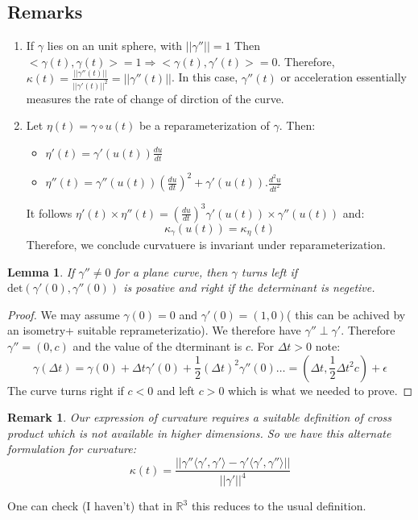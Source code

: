 \documentclass[oneside]{book}\twocolumn
\newtheorem{lemma}[theorem]{Lemma}
\newtheorem*{remark}{Remark}
\begin{document}
\subsection{Remarks}
\begin{enumerate}
    \item If $\gamma$ lies on an unit sphere, with $||\gamma''||=1$ Then $<\gamma(t),\gamma(t)>=1\Rightarrow <\gamma(t),\gamma'(t)>=0$. Therefore, $\kappa(t)=\frac{||\gamma''(t)||}{||\gamma'(t)||^2}=||\gamma''(t)||$. In this case, $\gamma''(t)$ or acceleration essentially measures the rate of change of dirction of the curve.  
    \item Let $\eta(t)=\gamma\circ u(t)$ be a reparameterization of $\gamma$. Then:
    \begin{itemize}
        \item $\eta'(t)=\gamma'\left(u(t)\right)\frac{du}{dt}$
        \item $\eta''(t)=\gamma''\left(u(t)\right)\left(\frac{du}{dt}\right)^2+\gamma'(u(t)).\frac{d^2u}{dt^2}$
    \end{itemize}
    It follows $\eta'(t)\times \eta''(t)=\left(\frac{du}{dt}\right)^3\gamma'\left(u(t)\right)\times \gamma''\left(u(t)\right)$ and:
    $$\kappa_{\gamma}\left(u(t)\right)=\kappa_\eta\left(t\right)$$
    Therefore, we conclude curvatuere is invariant under reparameterization.
\end{enumerate}
\begin{lemma}
    If $\gamma''\ne 0$ for a plane curve, then $\gamma$ turns left if $\text{det}\left(\gamma'(0),\gamma''(0)\right)$ is posative and right if the determinant is negetive. 
\end{lemma}
\begin{proof}
    We may assume $\gamma(0)=0$ and $\gamma'(0)=(1,0)$( this can be achived by an isometry+ suitable reprameterizatio). We therefore have $\gamma''\perp\gamma'$. Therefore $\gamma''=(0,c)$ and the value of the dterminant is $c$. For $\Delta t>0$ note:
    $$\gamma(\Delta t)=\gamma(0)+\Delta t\gamma'(0)+\frac{1}{2}
    \left(\Delta t\right)^2\gamma''(0)\hdots=\left(\Delta t,\frac{1}{2}\Delta t^2c\right)+\epsilon$$
    The curve turns right if $c<0$ and left $c>0$ which is what we needed to prove.
\end{proof}
\begin{remark}
    Our expression of curvature requires a suitable definition of cross product which is not available in higher dimensions. So we have this alternate formulation for curvature:
    $$\kappa(t)=\frac{||\gamma''\langle \gamma',\gamma'\rangle-\gamma'\langle \gamma',\gamma''\rangle||}{||\gamma'||^4}$$
\end{remark}
One can check (I haven't) that in $\mathbb R^3$ this reduces to the usual definition.
\end{document}
